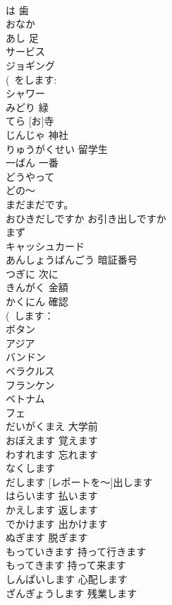 \documentclass[8pt]{extreport}
\begin{document}
\begin{CJK}{UTF8}{min}
\\	は	歯	
\\	おなか			
\\	あし	足	
\\	サービス			
\\	ジョギング			
\\	(~をします: 
\\	シャワー			
\\	みどり	緑	
\\	[お]てら	[お]寺	
\\	じんじゃ	神社	
\\	りゅうがくせい	留学生	
\\	一ばん	一番	
\\	どうやって			
\\	どの～			
\\	[いいえ、]まだまだです。			
\\	おひきだしですか	お引き出しですか	
\\	まず			
\\	キャッシュカード			
\\	あんしょうばんごう	暗証番号	
\\	つぎに	次に	
\\	きんがく	金額	
\\	かくにん	確認	
\\	(~します：
\\	ボタン			
\\	アジア			
\\	バンドン			
\\	ベラクルス			
\\	フランケン			
\\	ベトナム			
\\	フェ			
\\	だいがくまえ	大学前	
\\	おぼえます	覚えます	
\\	わすれます	忘れます	
\\	なくします			
\\	[レポートを～]だします	[レポートを～]出します	
\\	はらいます	払います	
\\	かえします	返します	
\\	でかけます	出かけます	
\\	ぬぎます	脱ぎます	
\\	もっていきます	持って行きます	
\\	もってきます	持って来ます	
\\	しんぱいします	心配します	
\\	ざんぎょうします	残業します	

\end{CJK}
\end{document}
